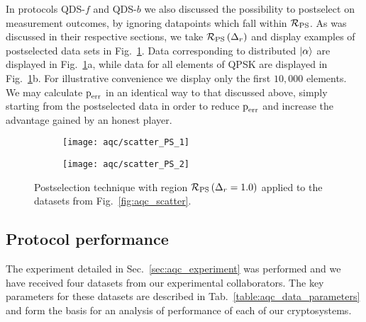 In protocols QDS-$f$ and QDS-$b$ we also discussed the possibility to postselect on measurement outcomes, by ignoring datapoints which fall within $\mathcal{R}_{\text{PS}}$. As was discussed in their respective sections, we take $\mathcal{R}_{\text{PS}}\left(\Delta_r\right)$ and display examples of postselected data sets in Fig.~\ref{fig:aqc_ps}. Data corresponding to distributed $\ket{\alpha}$ are displayed in Fig.~\ref{fig:aqc_ps}a, while data for all elements of QPSK are displayed in Fig.~\ref{fig:aqc_ps}b. For illustrative convenience we display only the first $10,000$ elements. We may calculate $\text{p}_{\text{err}}$ in an identical way to that discussed above, simply starting from the postselected data in order to reduce $\text{p}_{\text{err}}$ and increase the advantage gained by an honest player.

\begin{figure}[htp]
\captionsetup{width=0.8\linewidth}
\centering
	\begin{subfigure}{0.49\linewidth}
	\centering
	\texttt{[image: aqc/scatter\_PS\_1]}
	\caption{}
	\end{subfigure}
	\begin{subfigure}{0.49\linewidth}
	\centering
	\texttt{[image: aqc/scatter\_PS\_2]}
	\caption{}
	\end{subfigure}
\caption{\label{fig:aqc_ps} Postselection technique with region $\mathcal{R}_{\text{PS}}\left(\Delta_r=1.0\right)$ applied to the datasets from Fig.~\ref{fig:aqc_scatter}.}
\end{figure}


\FloatBarrier
\subsection{Protocol performance}\label{sec:aqc_performance}
The experiment detailed in Sec.~\ref{sec:aqc_experiment} was  performed and we have received four datasets from our experimental collaborators. The key parameters for these datasets are described in Tab.~\ref{table:aqc_data_parameters} and form the basis for an analysis of performance of each of our cryptosystems.

